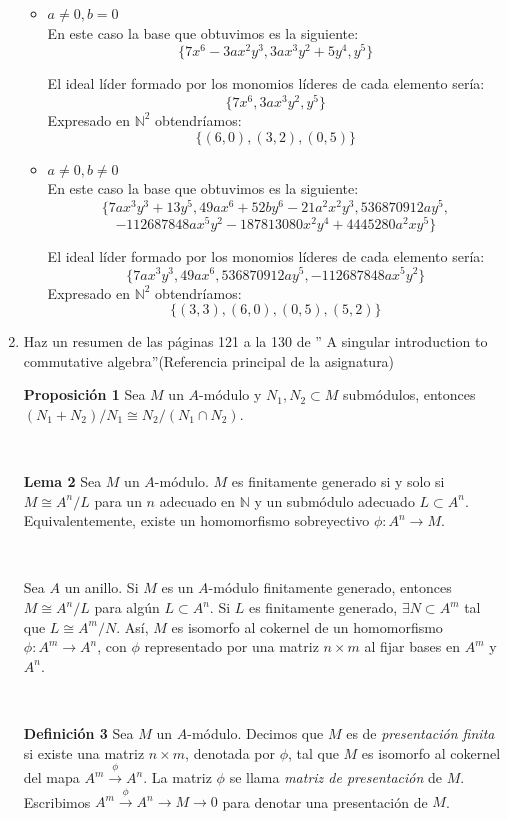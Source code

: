 \documentclass[10pt,a4paper]{article}
\begin{document}
\begin{enumerate}[label=(\alph*)]
\begin{itemize}
		\item \(a \neq 0, b = 0\) \\
		En este caso la base que obtuvimos es la siguiente:
		\[
		\{7 x^6 - 3a x^2 y^3, 3a x^3 y^2 + 5y^4, y^5\}
		\]
		
		El ideal líder formado por los monomios líderes de cada elemento sería:
		\[
		\{7 x^6 , 3a x^3 y^2, y^5\}
		\]
		Expresado en \(\mathbb{N}^2\) obtendríamos:
		\[
		\{ (6,0), (3,2), (0,5)\}
		\]
		
		
		\item \(a \neq 0, b \neq 0\) \\
		En este caso la base que obtuvimos es la siguiente:
		\[
		\{7ax^3y^3+13y^5,49ax^6+52by^6-21a^2x^2y^3, 536870912ay^5,
		\]
		\[
		-112687848ax^5y^2 - 187813080x^2y^4 + 4445280a^2xy^5\}
		\]
		
		El ideal líder formado por los monomios líderes de cada elemento sería:
		\[
		\{7ax^3y^3,49ax^6, 536870912ay^5,-112687848ax^5y^2 \}
		\]
		Expresado en \(\mathbb{N}^2\) obtendríamos:
		\[
		\{ (3,3), (6,0) , (0,5), (5,2)\}
		\]
	\end{itemize}
	
	\item Haz un resumen de las páginas 121 a la 130 de ” A singular introduction to commutative algebra”(Referencia principal de la asignatura)
	
	\textbf{Proposición 1} Sea \( M \) un \( A \)-módulo y \( N_1, N_2 \subset M \) submódulos, entonces \( (N_1 + N_2)/N_1 \cong N_2/(N_1 \cap N_2) \).

\

\textbf{Lema 2} Sea \( M \) un \( A \)-módulo. \( M \) es finitamente generado si y solo si \( M \cong A^n/L \) para un \( n \) adecuado en \( \mathbb{N} \) y un submódulo adecuado \( L \subset A^n \). Equivalentemente, existe un homomorfismo sobreyectivo \( \phi : A^n \to M \).

\

Sea \( A \) un anillo. Si \( M \) es un \( A \)-módulo finitamente generado, entonces \( M \cong A^n/L \) para algún \( L \subset A^n \). Si \( L \) es finitamente generado, \(\exists N \subset A^m\) tal que \( L \cong A^m/N \). Así, \( M \) es isomorfo al cokernel de un homomorfismo \( \phi: A^m \to A^n \), con \( \phi \) representado por una matriz \( n \times m \) al fijar bases en \( A^m \) y \( A^n \).

\

\textbf{Definición 3} Sea \( M \) un \( A \)-módulo. Decimos que \( M \) es de \textit{presentación finita} si existe una matriz \( n \times m \), denotada por \( \phi \), tal que \( M \) es isomorfo al cokernel del mapa \( A^m \xrightarrow{\phi} A^n \). La matriz \( \phi \) se llama \textit{matriz de presentación} de \( M \). Escribimos \( A^m \xrightarrow{\phi} A^n \to M \to 0 \) para denotar una presentación de \( M \).


\end{enumerate}
\end{document}
